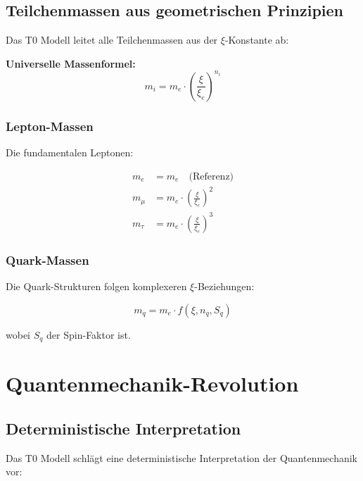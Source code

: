 	\section{Teilchenmassen aus geometrischen Prinzipien}
	
	Das T0 Modell leitet alle Teilchenmassen aus der $\xi$-Konstante ab:
	
	\begin{formel}
		\textbf{Universelle Massenformel:}
		\begin{equation}
			m_i = m_e \cdot \left(\frac{\xi}{\xi_e}\right)^{n_i}
		\end{equation}
	\end{formel}
	
	\subsection{Lepton-Massen}
	
	Die fundamentalen Leptonen:
	
	\begin{align}
		m_e &= m_e \quad \text{(Referenz)} \\
		m_\mu &= m_e \cdot \left(\frac{\xi}{\xi_e}\right)^2 \\
		m_\tau &= m_e \cdot \left(\frac{\xi}{\xi_e}\right)^3
	\end{align}
	
	\subsection{Quark-Massen}
	
	Die Quark-Strukturen folgen komplexeren $\xi$-Beziehungen:
	
	\begin{equation}
		m_q = m_e \cdot f(\xi, n_q, S_q)
	\end{equation}
	
	wobei $S_q$ der Spin-Faktor ist.
	

	\chapter{Quantenmechanik-Revolution}
	
	\section{Deterministische Interpretation}
	
	Das T0 Modell schlägt eine deterministische Interpretation der Quantenmechanik vor:
	
